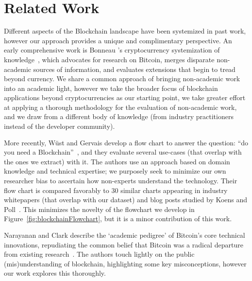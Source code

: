 
\section{Related Work}
\label{sec:related-works}

Different aspects of the Blockchain landscape have been systemized in past work, however our approach provides a unique and complimentary perspective. An early comprehensive work is Bonneau \etal's cryptocurrency systemization of knowledge~\cite{BMC+15}, which advocates for research on Bitcoin, merges disparate non-academic sources of information, and evaluates extensions that begin to tread beyond currency. We share a common approach of bringing non-academic work into an academic light, however we take the broader focus of blockchain applications beyond cryptocurrencies as our starting point, we take greater effort at applying a thorough methodology for the evaluation of non-academic work, and we draw from a different body of knowledge (\ie from industry practitioners instead of the developer community).

More recently, W{\"u}st and Gervais develop a flow chart to answer the question: ``do you need a Blockchain''~\cite{Wust17}, and they evaluate several use-cases (that overlap with the ones we extract) with it. The authors use an approach based on domain knowledge and technical expertise; we purposely seek to minimize our own researcher bias to ascertain how non-experts understand the technology. Their flow chart is compared favorably to 30 similar charts appearing in industry whitepapers (that overlap with our dataset) and blog posts studied by Koens and Poll~\cite{koens2018blockchain}. This minimizes the novelty of the flowchart we develop in Figure~\ref{fig:blockchainFlowchart}, but it is a minor contribution of this work. 

Narayanan and Clark describe the `academic pedigree' of Bitcoin's core technical innovations, repudiating the common belief that Bitcoin was a radical departure from existing research~\cite{Narayanan17}. The authors touch lightly on the public (mis)understanding of blockchain, highlighting some key misconceptions, however our work explores this thoroughly.


